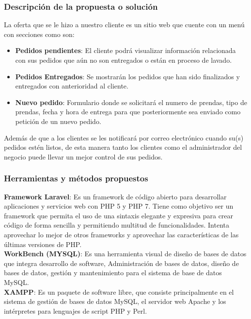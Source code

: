 \subsubsection{Descripción de la propuesta o solución}
La oferta que se le hizo a nuestro cliente es un sitio web que cuente con un menú con secciones como son:

\begin{itemize}
\item \textbf{Pedidos pendientes}: El cliente podrá visualizar información relacionada con sus pedidos que aún no son entregados o están en proceso de lavado.

\item \textbf{Pedidos Entregados}: Se mostrarán los pedidos que han sido finalizados y entregados con anterioridad al cliente.

\item \textbf{Nuevo pedido}: Formulario donde se solicitará el numero de prendas, tipo de prendas, fecha y hora de entrega para que posteriormente sea enviado como petición de un nuevo pedido.
\end{itemize}



Además de que a los clientes se les notificará por correo electrónico cuando su(s) pedidos estén listos, de esta manera tanto los clientes como el administrador del negocio puede llevar un mejor control de sus pedidos.


\subsubsection{Herramientas y métodos propuestos}


\textbf{Framework Laravel}: Es un framework de código abierto para desarrollar aplicaciones y servicios web con PHP 5 y PHP 7. Tiene como objetivo ser un framework que permita el uso de una sintaxis elegante y expresiva para crear código de forma sencilla y permitiendo multitud de funcionalidades. Intenta aprovechar lo mejor de otros frameworks y aprovechar las características de las últimas versiones de PHP.\\

\textbf{WorkBench (MYSQL)}: Es una herramienta visual de diseño de bases de datos que integra desarrollo de software, Administración de bases de datos, diseño de bases de datos, gestión y mantenimiento para el sistema de base de datos MySQL.\\

\textbf{XAMPP}: Es un paquete de software libre, que consiste principalmente en el sistema de gestión de bases de datos MySQL, el servidor web Apache y los intérpretes para lenguajes de script PHP y Perl.\\

